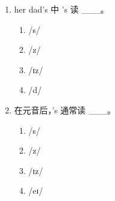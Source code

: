 \documentclass[11pt,a4paper]{ctexart}
\begin{document}
\begin{enumerate}[leftmargin=*,itemsep=4pt]
\begin{enumerate}[label=\Alph*.,leftmargin=2em,itemsep=1pt,topsep=2pt]
\item 不变
\item 加 /z/
\item 加 /ɪz/
\item 加 /s/
\end{enumerate}
\item her dad’s 中 ’s 读 \_\_\_。
\begin{enumerate}[label=\Alph*.,leftmargin=2em,itemsep=1pt,topsep=2pt]
\item /s/
\item /z/
\item /ɪz/
\item /d/
\end{enumerate}
\item 在元音后，’s 通常读 \_\_\_。
\begin{enumerate}[label=\Alph*.,leftmargin=2em,itemsep=1pt,topsep=2pt]
\item /s/
\item /z/
\item /ɪz/
\item /eɪ/
\end{enumerate}
\end{enumerate}
\end{document}
